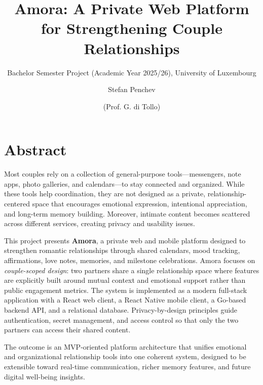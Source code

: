 \documentclass[sigconf, authorversion, nonacm, margin=0.75in]{acmart}
\begin{document}
\title{Amora: A Private Web Platform for Strengthening Couple Relationships}
\subtitle{Bachelor Semester Project (Academic Year 2025/26), University of Luxembourg}

\author{Stefan Penchev}

\author{(Prof. G. di Tollo)}

\maketitle

\section*{Abstract}
Most couples rely on a collection of general-purpose tools—messengers, note apps, photo galleries, and calendars—to stay connected and organized. While these tools help coordination, they are not designed as a private, relationship-centered space that encourages emotional expression, intentional appreciation, and long-term memory building. Moreover, intimate content becomes scattered across different services, creating privacy and usability issues.

This project presents \textbf{Amora}, a private web and mobile platform designed to strengthen romantic relationships through shared calendars, mood tracking, affirmations, love notes, memories, and milestone celebrations. Amora focuses on \textit{couple-scoped design}: two partners share a single relationship space where features are explicitly built around mutual context and emotional support rather than public engagement metrics. The system is implemented as a modern full-stack application with a React web client, a React Native mobile client, a Go-based backend API, and a relational database. Privacy-by-design principles guide authentication, secret management, and access control so that only the two partners can access their shared content.

The outcome is an MVP-oriented platform architecture that unifies emotional and organizational relationship tools into one coherent system, designed to be extensible toward real-time communication, richer memory features, and future digital well-being insights.
\end{document}
